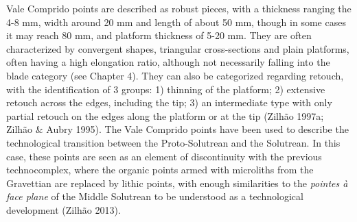 \documentclass[12pt,twoside]{reedthesis}
\begin{document}
Vale Comprido points are described as robust pieces, with a thickness ranging the 4-8 mm, width around 20 mm and length of about 50 mm, though in some cases it may reach 80 mm, and platform thickness of 5-20 mm. They are often characterized by convergent shapes, triangular cross-sections and plain platforms, often having a high elongation ratio, although not necessarily falling into the blade category (see Chapter 4). They can also be categorized regarding retouch, with the identification of 3 groups: 1) thinning of the platform; 2) extensive retouch across the edges, including the tip; 3) an intermediate type with only partial retouch on the edges along the platform or at the tip (Zilhão 1997a; Zilhão \& Aubry 1995). The Vale Comprido points have been used to describe the technological transition between the Proto-Solutrean and the Solutrean. In this case, these points are seen as an element of discontinuity with the previous technocomplex, where the organic points armed with microliths from the Gravettian are replaced by lithic points, with enough similarities to the \emph{pointes à face plane} of the Middle Solutrean to be understood as a technological development (Zilhão 2013).
\end{document}
